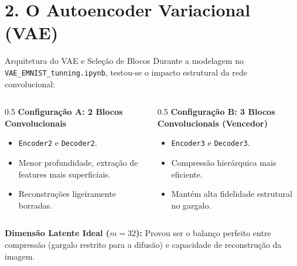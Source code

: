 \documentclass[10pt,aspectratio=169]{beamer}
\begin{document}
\section{2. O Autoencoder Variacional (VAE)}
\begin{frame}{Arquitetura do VAE e Seleção de Blocos}
    Durante a modelagem no \texttt{VAE\_EMNIST\_tunning.ipynb}, testou-se o impacto estrutural da rede convolucional:
    \vspace{0.2cm}
    \begin{columns}
        \begin{column}{0.5\textwidth}
            \textbf{Configuração A: 2 Blocos Convolucionais}
            \begin{itemize}
                \item \texttt{Encoder2} e \texttt{Decoder2}.
                \item Menor profundidade, extração de features mais superficiais.
                \item Reconstruções ligeiramente borradas.
            \end{itemize}
        \end{column}
        \begin{column}{0.5\textwidth}
            \textbf{Configuração B: 3 Blocos Convolucionais (Vencedor)}
            \begin{itemize}
                \item \texttt{Encoder3} e \texttt{Decoder3}.
                \item Compressão hierárquica mais eficiente.
                \item Mantém alta fidelidade estrutural no gargalo.
            \end{itemize}
        \end{column}
    \end{columns}
    \vspace{0.4cm}
    \textbf{Dimensão Latente Ideal ($m=32$):} Provou ser o balanço perfeito entre compressão (gargalo restrito para a difusão) e capacidade de reconstrução da imagem.
\end{frame}
\end{document}
